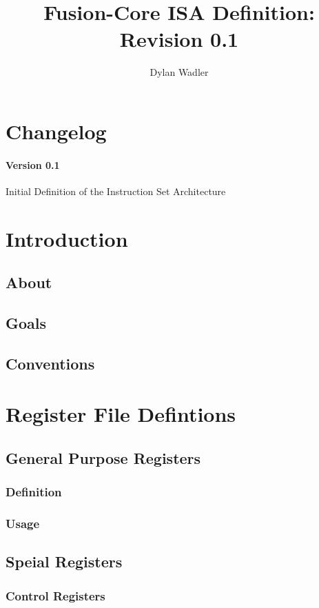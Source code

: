 \documentclass[letterpaper]{article}
\title{Fusion-Core ISA Definition: Revision 0.1}
\author{Dylan Wadler}
\begin{document}
\maketitle
\newpage
\tableofcontents


\newpage
\section{Changelog}
\paragraph{Version 0.1} Initial Definition of the Instruction Set Architecture

\section{Introduction}
\subsection{About}
\subsection{Goals}
\subsection{Conventions}



\section{Register File Defintions}
\subsection{General Purpose Registers}
\subsubsection{Definition}
\subsubsection{Usage}
\subsection{Speial Registers}
\subsubsection{Control Registers}
\end{document}
